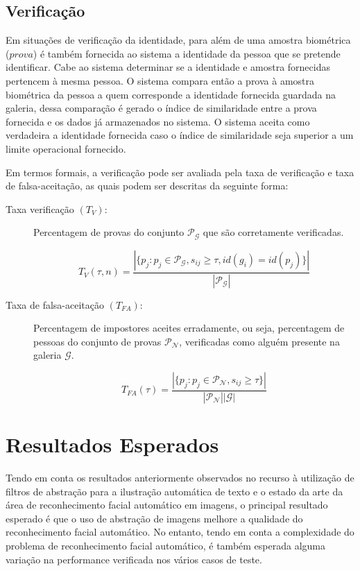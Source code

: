 \subsection{Verificação}

Em situações de verificação da identidade, para além de uma amostra biométrica ($prova$) é também fornecida ao sistema a identidade da pessoa que se pretende identificar. Cabe ao sistema determinar se a identidade e amostra fornecidas pertencem à mesma pessoa. O sistema compara então a prova à amostra biométrica  da pessoa a quem corresponde a identidade fornecida guardada na galeria, dessa comparação é gerado o índice de similaridade entre a prova fornecida e os dados já armazenados no sistema. O sistema aceita como verdadeira a identidade fornecida caso o índice de similaridade seja superior a um  limite operacional fornecido.

Em termos formais, a verificação pode ser avaliada pela taxa de verificação e taxa de falsa-aceitação, as quais podem ser descritas da seguinte forma:

\begin{description}
 \item[Taxa verificação $(T_{V})$:] Percentagem de provas do conjunto $\mathscr{P}_\mathscr{G}$ que são corretamente verificadas.

\begin{equation}
 T_{V}(\tau, n) = \frac{|\{p_j:p_j \in \mathscr{P}_\mathscr{G}, s_{ij} \geqslant \tau, id(g_i)=id(p_j)\}|}{|\mathscr{P}_\mathscr{G}|}
\end{equation}

  \item[Taxa de falsa-aceitação $(T_{FA})$:] Percentagem de impostores aceites erradamente, ou seja, percentagem de pessoas do conjunto de provas $\mathscr{P}_\mathscr{N}$, verificadas como alguém presente na galeria $\mathscr{G}$.
  
\begin{equation}
 T_{FA}(\tau) = \frac{|\{p_j:p_j \in \mathscr{P}_\mathscr{N}, s_{ij} \geqslant \tau\}|}{|\mathscr{P}_\mathscr{N}||\mathscr{G}|}
\end{equation}

\end{description}



\section{Resultados Esperados}
Tendo em conta os resultados anteriormente observados no recurso à utilização de filtros de abstração para a ilustração automática de texto e o estado da arte da área de reconhecimento facial automático em imagens, o principal resultado esperado é que o uso de abstração de imagens melhore a qualidade do reconhecimento facial automático. No entanto, tendo em conta a complexidade do problema de reconhecimento facial automático, é também esperada alguma variação na performance verificada nos vários casos de teste.

